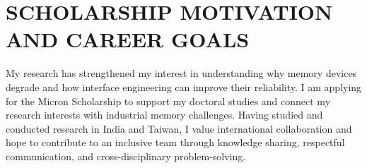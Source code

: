\documentclass[10pt,a4paper]{article}
\begin{document}
\section{SCHOLARSHIP MOTIVATION AND CAREER GOALS}


My research has strengthened my interest in understanding why
memory devices degrade and how interface engineering can improve
their reliability. I am applying for the Micron Scholarship to
support my doctoral studies and connect my research interests
with industrial memory challenges. Having studied and conducted
research in India and Taiwan, I value international collaboration
and hope to contribute to an inclusive team through knowledge
sharing, respectful communication, and cross-disciplinary
problem-solving.
\end{document}
